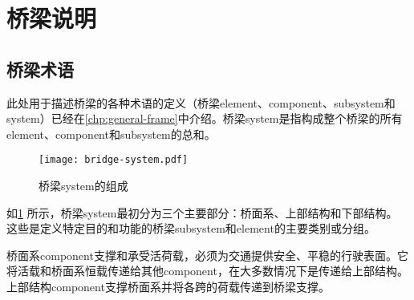 \section{桥梁说明}
\label{sec:bridge-system-description}
\subsection{桥梁术语}
此处用于描述桥梁的各种术语的定义（桥梁\gls*{element}、\gls*{component}、\gls*{subsystem}和\gls*{system}）已经在\cref{chp:general-frame}中介绍。桥梁\gls*{system}是指构成整个桥梁的所有\gls*{element}、\gls*{component}和\gls*{subsystem}的总和。

\begin{figure}
  \texttt{[image: bridge-system.pdf]}
  \caption{桥梁\gls*{system}的组成}
  \label{fig:bridge-system-composition}
\end{figure}

如\cref{fig:bridge-system-composition} 所示，桥梁\gls*{system}最初分为三个主要部分：桥面系、上部结构和下部结构。 这些是定义特定目的和功能的桥梁\gls*{subsystem}和\gls*{element}的主要类别或分组。

桥面系\gls*{component}支撑和承受活荷载，必须为交通提供安全、平稳的行驶表面。它将活载和桥面系恒载传递给其他\gls*{component}，在大多数情况下是传递给上部结构。 上部结构\gls*{component}支撑桥面系并将各跨的荷载传递到桥梁支撑。

